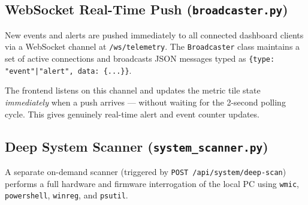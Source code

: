 \documentclass[12pt,a4paper]{article}
\begin{document}
\subsection{WebSocket Real-Time Push (\texttt{broadcaster.py})}

New events and alerts are pushed immediately to all connected dashboard clients
via a WebSocket channel at \texttt{/ws/telemetry}. The \texttt{Broadcaster} class
maintains a set of active connections and broadcasts JSON messages typed as
\texttt{\{type: "event"|\allowbreak "alert", data: \{...\}\}}.

The frontend listens on this channel and updates the metric tile state
\emph{immediately} when a push arrives — without waiting for the 2-second polling
cycle. This gives genuinely real-time alert and event counter updates.

\subsection{Deep System Scanner (\texttt{system\_scanner.py})}

A separate on-demand scanner (triggered by \texttt{POST /api/system/deep-scan})
performs a full hardware and firmware interrogation of the local PC using
\texttt{wmic}, \texttt{powershell}, \texttt{winreg}, and \texttt{psutil}.
\end{document}
